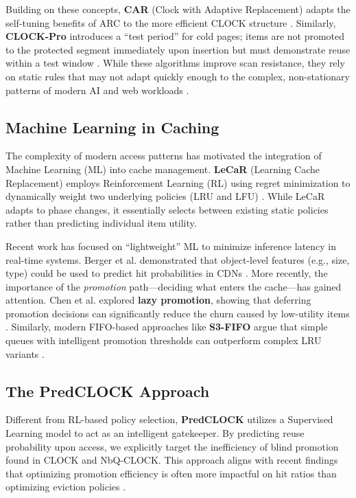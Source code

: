 Building on these concepts, \textbf{CAR} (Clock with Adaptive
Replacement) adapts the self-tuning benefits of ARC to the more
efficient CLOCK structure \cite{Bansal2004CAR}. Similarly,
\textbf{CLOCK-Pro} introduces a ``test period'' for cold pages; items
are not promoted to the protected segment immediately upon insertion
but must demonstrate reuse within a test window
\cite{Jiang2005CLOCKPro}. While these algorithms improve scan
resistance, they rely on static rules that may not adapt quickly
enough to the complex, non-stationary patterns of modern AI and web
workloads \cite{Zhang2025Rethinking}.

\subsection{Machine Learning in Caching}
The complexity of modern access patterns has motivated the
integration of Machine Learning (ML) into cache management.
\textbf{LeCaR} (Learning Cache Replacement) employs Reinforcement
Learning (RL) using regret minimization to dynamically weight two
underlying policies (LRU and LFU) \cite{Vietri2018LeCaR}. While LeCaR
adapts to phase changes, it essentially selects between existing
static policies rather than predicting individual item utility.

Recent work has focused on ``lightweight'' ML to minimize inference
latency in real-time systems. Berger et al. demonstrated that
object-level features (e.g., size, type) could be used to predict hit
probabilities in CDNs \cite{Berger2018Towards}. More recently, the
importance of the \textit{promotion} path—deciding what enters the
cache—has gained attention. Chen et al. explored \textbf{lazy
promotion}, showing that deferring promotion decisions can
significantly reduce the churn caused by low-utility items
\cite{chen2025lazy}. Similarly, modern FIFO-based approaches like
\textbf{S3-FIFO} argue that simple queues with intelligent promotion
thresholds can outperform complex LRU variants \cite{Yang2023S3FIFO}.

\subsection{The PredCLOCK Approach}
Different from RL-based policy selection, \textbf{PredCLOCK} utilizes
a Supervised Learning model to act as an intelligent gatekeeper. By
predicting reuse probability upon access, we explicitly target the
inefficiency of blind promotion found in CLOCK and NbQ-CLOCK. This
approach aligns with recent findings that optimizing promotion
efficiency is often more impactful on hit ratios than optimizing
eviction policies \cite{chen2025lazy, Zhang2024SIEVE}.
